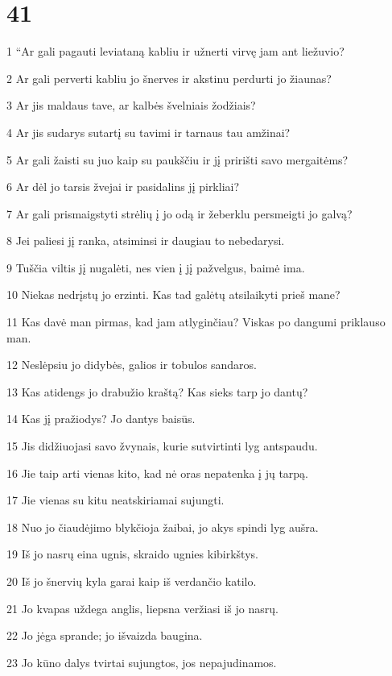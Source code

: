 \chapter{41}


\par 1 “Ar gali pagauti leviataną kabliu ir užnerti virvę jam ant liežuvio? 
\par 2 Ar gali perverti kabliu jo šnerves ir akstinu perdurti jo žiaunas? 
\par 3 Ar jis maldaus tave, ar kalbės švelniais žodžiais? 
\par 4 Ar jis sudarys sutartį su tavimi ir tarnaus tau amžinai? 
\par 5 Ar gali žaisti su juo kaip su paukščiu ir jį pririšti savo mergaitėms? 
\par 6 Ar dėl jo tarsis žvejai ir pasidalins jį pirkliai? 
\par 7 Ar gali prismaigstyti strėlių į jo odą ir žeberklu persmeigti jo galvą? 
\par 8 Jei paliesi jį ranka, atsiminsi ir daugiau to nebedarysi. 
\par 9 Tuščia viltis jį nugalėti, nes vien į jį pažvelgus, baimė ima. 
\par 10 Niekas nedrįstų jo erzinti. Kas tad galėtų atsilaikyti prieš mane? 
\par 11 Kas davė man pirmas, kad jam atlyginčiau? Viskas po dangumi priklauso man. 
\par 12 Neslėpsiu jo didybės, galios ir tobulos sandaros. 
\par 13 Kas atidengs jo drabužio kraštą? Kas sieks tarp jo dantų? 
\par 14 Kas jį pražiodys? Jo dantys baisūs. 
\par 15 Jis didžiuojasi savo žvynais, kurie sutvirtinti lyg antspaudu. 
\par 16 Jie taip arti vienas kito, kad nė oras nepatenka į jų tarpą. 
\par 17 Jie vienas su kitu neatskiriamai sujungti. 
\par 18 Nuo jo čiaudėjimo blykčioja žaibai, jo akys spindi lyg aušra. 
\par 19 Iš jo nasrų eina ugnis, skraido ugnies kibirkštys. 
\par 20 Iš jo šnervių kyla garai kaip iš verdančio katilo. 
\par 21 Jo kvapas uždega anglis, liepsna veržiasi iš jo nasrų. 
\par 22 Jo jėga sprande; jo išvaizda baugina. 
\par 23 Jo kūno dalys tvirtai sujungtos, jos nepajudinamos. 
